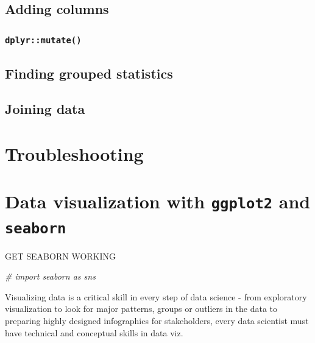 \documentclass[
]{book}
\newenvironment{Shaded}{\begin{snugshade}}{\end{snugshade}}
\newcommand{\CommentTok}[1]{\textcolor[rgb]{0.56,0.35,0.01}{\textit{#1}}}
\begin{document}
\hypertarget{adding-columns}{%
\section{Adding columns}\label{adding-columns}}

\hypertarget{dplyrmutate}{%
\subsection{\texorpdfstring{\texttt{dplyr::mutate()}}{dplyr::mutate()}}\label{dplyrmutate}}

\hypertarget{finding-grouped-statistics}{%
\section{Finding grouped statistics}\label{finding-grouped-statistics}}

\hypertarget{joining-data-1}{%
\section{Joining data}\label{joining-data-1}}

\hypertarget{troubleshooting}{%
\chapter{Troubleshooting}\label{troubleshooting}}

\hypertarget{data-visualization-with-ggplot2-and-seaborn}{%
\chapter{\texorpdfstring{Data visualization with \texttt{ggplot2} and \texttt{seaborn}}{Data visualization with ggplot2 and seaborn}}\label{data-visualization-with-ggplot2-and-seaborn}}

GET SEABORN WORKING

\begin{Shaded}
\begin{Highlighting}[]
\CommentTok{\# import seaborn as sns}
\end{Highlighting}
\end{Shaded}

Visualizing data is a critical skill in every step of data science - from exploratory visualization to look for major patterns, groups or outliers in the data to preparing highly designed infographics for stakeholders, every data scientist must have technical and conceptual skills in data viz.~
\end{document}
